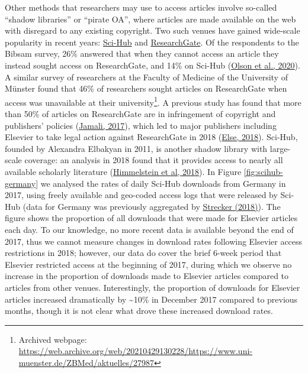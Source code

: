 \documentclass[
]{article}
\begin{document}
Other methods that researchers may use to access articles involve so-called ``shadow libraries'' or ``pirate OA'', where articles are made available on the web with disregard to any existing copyright. Two such venues have gained wide-scale popularity in recent years: \href{https://sci-hub.se/}{Sci-Hub} and \href{https://www.researchgate.net/}{ResearchGate}. Of the respondents to the Bibsam survey, 26\% answered that when they cannot access an article they instead sought access on ResearchGate, and 14\% on Sci-Hub (\href{http://doi.org/10.1629/uksg.507}{Olson et al., 2020}). A similar survey of researchers at the Faculty of Medicine of the University of Münster found that 46\% of researchers sought articles on ResearchGate when access was unavailable at their university\footnote{Archived webpage: \url{https://web.archive.org/web/20210429130228/https://www.uni-muenster.de/ZBMed/aktuelles/27987}}. A previous study has found that more than 50\% of articles on ResearchGate are in infringement of copyright and publishers' policies (\href{https://doi.org/10.1007/s11192-017-2291-4}{Jamali, 2017}), which led to major publishers including Elsevier to take legal action against ResearchGate in 2018 (\href{https://doi.org/10.1038/d41586-018-06945-6}{Else, 2018}). Sci-Hub, founded by Alexandra Elbakyan in 2011, is another shadow library with large-scale coverage: an analysis in 2018 found that it provides access to nearly all available scholarly literature (\href{https://doi.org/10.7554/eLife.32822}{Himmelstein et al, 2018}). In Figure \ref{fig:scihub-germany} we analysed the rates of daily Sci-Hub downloads from Germany in 2017, using freely available and geo-coded access logs that were released by Sci-Hub (data for Germany was previously aggregated by \href{http://doi.org/10.5281/zenodo.1286284}{Strecker (2018)}). The figure shows the proportion of all downloads that were made for Elsevier articles each day. To our knowledge, no more recent data is available beyond the end of 2017, thus we cannot measure changes in download rates following Elsevier access restrictions in 2018; however, our data do cover the brief 6-week period that Elsevier restricted access at the beginning of 2017, during which we observe no increase in the proportion of downloads made to Elsevier articles compared to articles from other venues. Interestingly, the proportion of downloads for Elsevier articles increased dramatically by \textasciitilde10\% in December 2017 compared to previous months, though it is not clear what drove these increased download rates.
\end{document}
